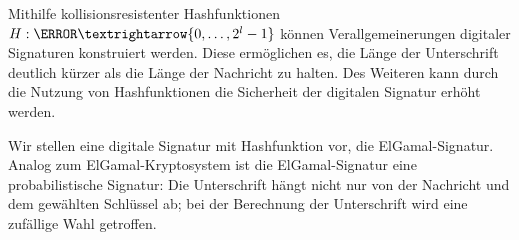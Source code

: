 Mithilfe kollisionsresistenter Hashfunktionen $H: \N → \{0, \dotsc, 2^l-1\}$ können Verallgemeinerungen digitaler Signaturen konstruiert werden. Diese ermöglichen es, die Länge der Unterschrift deutlich kürzer als die Länge der Nachricht zu halten. Des Weiteren kann durch die Nutzung von Hashfunktionen die Sicherheit der digitalen Signatur erhöht werden.
% 


%   

Wir stellen eine digitale Signatur mit Hashfunktion vor, die ElGamal-Signatur. Analog zum ElGamal-Kryptosystem ist die ElGamal-Signatur eine probabilistische Signatur: Die Unterschrift hängt nicht nur von der Nachricht und dem gewählten Schlüssel ab; bei der Berechnung der Unterschrift wird eine zufällige Wahl getroffen.

